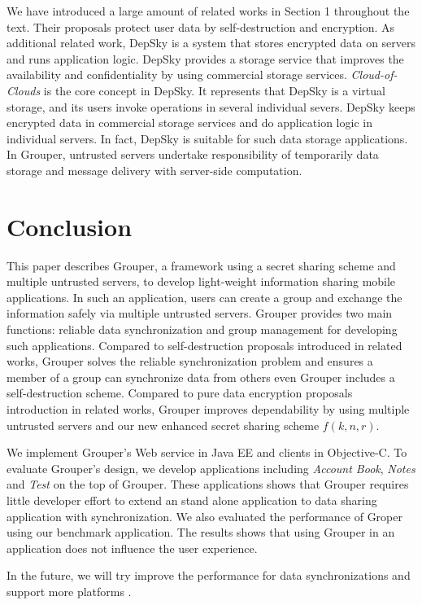 \documentclass[twocolumn,10pt]{article}
\begin{document}
We have introduced a large amount of related works in Section 1 throughout the text. 
Their proposals protect user data by self-destruction and encryption.
As additional related work, DepSky\cite{bessani2013depsky} is a system that stores encrypted data on servers and runs application logic. 
DepSky provides a storage service that improves the availability and confidentiality by using commercial storage services. 
\emph{Cloud-of-Clouds} is the core concept in DepSky. 
It represents that DepSky is a virtual storage, and its users invoke operations in several individual severs. 
DepSky keeps encrypted data in commercial storage services and do application logic in individual servers.
In fact, DepSky is suitable for such data storage applications. 
In Grouper, untrusted servers undertake responsibility of temporarily data storage and message delivery with server-side computation.

\section{Conclusion}

This paper describes Grouper, a framework using a secret sharing scheme and multiple untrusted servers, to develop light-weight information sharing mobile applications.
In such an application, users can create a group and exchange the information safely via multiple untrusted servers.
Grouper provides two main functions: reliable data synchronization and group management for developing such applications.
Compared to self-destruction proposals introduced in related works, Grouper solves the reliable synchronization problem and ensures a member of a group can synchronize data from others even Grouper includes a self-destruction scheme.
Compared to pure data encryption proposals introduction in related works, Grouper improves dependability by using multiple untrusted servers and our new enhanced secret sharing scheme $f(k, n, r)$.

We implement Grouper's Web service in Java EE and clients in Objective-C. 
To evaluate Grouper's design, we develop applications including \emph{Account Book}, \emph{Notes} and \emph{Test} on the top of Grouper.
These applications shows that Grouper requires little developer effort to extend an stand alone application to data sharing application with synchronization.
We also evaluated the performance of Groper using our benchmark application.
The results shows that using Grouper in an application does not influence the user experience.

In the future, we will try improve the performance for data synchronizations and support more platforms .


{
	\footnotesize
	
}
\end{document}
